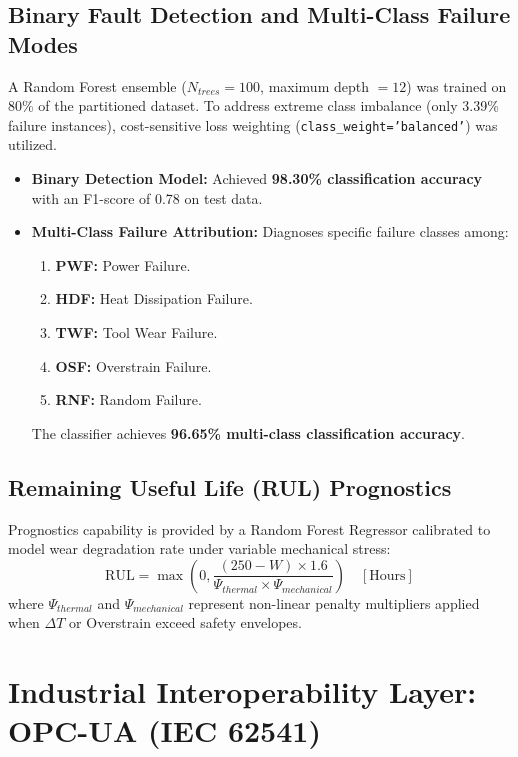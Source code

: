 \documentclass[11pt,a4paper]{article}
\begin{document}
\subsection{Binary Fault Detection and Multi-Class Failure Modes}
A Random Forest ensemble ($N_{trees} = 100$, maximum depth $= 12$) was trained on 80\% of the partitioned dataset. To address extreme class imbalance (only 3.39\% failure instances), cost-sensitive loss weighting (\texttt{class\_weight='balanced'}) was utilized.
\begin{itemize}
    \item \textbf{Binary Detection Model:} Achieved \textbf{98.30\% classification accuracy} with an F1-score of 0.78 on test data.
    \item \textbf{Multi-Class Failure Attribution:} Diagnoses specific failure classes among:
    \begin{enumerate}
        \item \textbf{PWF:} Power Failure.
        \item \textbf{HDF:} Heat Dissipation Failure.
        \item \textbf{TWF:} Tool Wear Failure.
        \item \textbf{OSF:} Overstrain Failure.
        \item \textbf{RNF:} Random Failure.
    \end{enumerate}
    The classifier achieves \textbf{96.65\% multi-class classification accuracy}.
\end{itemize}

\subsection{Remaining Useful Life (RUL) Prognostics}
Prognostics capability is provided by a Random Forest Regressor calibrated to model wear degradation rate under variable mechanical stress:
\begin{equation}
    \text{RUL} = \max\left(0, \frac{(250 - W) \times 1.6}{\Psi_{thermal} \times \Psi_{mechanical}}\right) \quad [\text{Hours}]
\end{equation}
where $\Psi_{thermal}$ and $\Psi_{mechanical}$ represent non-linear penalty multipliers applied when $\Delta T$ or Overstrain exceed safety envelopes.

\section{Industrial Interoperability Layer: OPC-UA (IEC 62541)}
\end{document}
